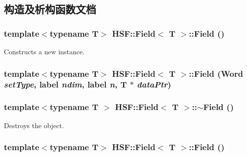 \subsection{构造及析构函数文档}
\hypertarget{classHSF_1_1Field_a67ca23ee998b8ec6ff61de5f714db4d6}{
\subsubsection[{Field}]{\setlength{\rightskip}{0pt plus 5cm}template$<$typename T$>$ {\bf HSF::Field}$<$ T $>$::{\bf Field} ()}}
\label{classHSF_1_1Field_a67ca23ee998b8ec6ff61de5f714db4d6}


Constructs a new instance. \hypertarget{classHSF_1_1Field_af76ece196c8cc0120f8d2eaa2eb2da16}{
\subsubsection[{Field}]{\setlength{\rightskip}{0pt plus 5cm}template$<$typename T$>$ {\bf HSF::Field}$<$ T $>$::{\bf Field} (Word {\em setType}, \/  label {\em ndim}, \/  label {\em n}, \/  T $\ast$ {\em dataPtr})}}
\label{classHSF_1_1Field_af76ece196c8cc0120f8d2eaa2eb2da16}
\hypertarget{classHSF_1_1Field_a7a1de4fe37f4483401a62dd7b410c577}{
\subsubsection[{$\sim$Field}]{\setlength{\rightskip}{0pt plus 5cm}template$<$typename T $>$ {\bf HSF::Field}$<$ T $>$::$\sim${\bf Field} ()}}
\label{classHSF_1_1Field_a7a1de4fe37f4483401a62dd7b410c577}


Destroys the object. \hypertarget{classHSF_1_1Field_a67ca23ee998b8ec6ff61de5f714db4d6}{
\subsubsection[{Field}]{\setlength{\rightskip}{0pt plus 5cm}template$<$typename T$>$ {\bf HSF::Field}$<$ T $>$::{\bf Field} ()}}
\label{classHSF_1_1Field_a67ca23ee998b8ec6ff61de5f714db4d6}



